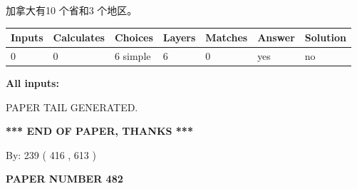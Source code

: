 \documentclass{ctexart}
\begin{document}
 
加拿大有10 个省和3 个地区。
 
 
\noindent{}
 
 
   
   
   
   
\noindent\begin{tabular}{|l|l|l|l|l|l|l|}
 \hline
Inputs & Calculates & Choices & Layers & Matches & Answer & Solution \\ \hline
 0  & 
 0  & 
 6
  simple  
  & 
 6  & 
 0  & 
  yes & 
  no 
  \\ \hline
 \end{tabular}
   
   
   
   
\noindent{}
   
   
   
   
\noindent\vspace{0.1in}\hspace{-0.08in} {\textbf{\Large{All inputs: }}}
   
   
   
   
   
   
 \vspace{0.2in}
 
   
   
\vspace{2.0in} PAPER TAIL GENERATED.
   
   
   
   
\vspace{1.0in} 
{\textbf{\large{ *** END OF PAPER, THANKS *** }}} 
   
   
\hspace{1.0in} By: 
 239 ( 416 ,  613 )
   
   
   
   
\newpage 
\setcounter{page}{ 
   482001 } 
   
   
   
   
 {\textbf{ \Large{ PAPER NUMBER  482  }}}
   
   
\vspace{0.2in}
   
   
   
   
   
   
   
\end{document}
